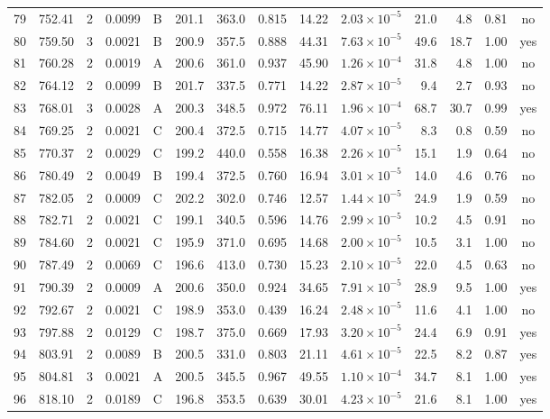 \begin{landscape}
\begin{longtable}{rrrrlrrrrrrrrc}
79 & 752.41 & 2 & 0.0099 & B & 201.1 & 363.0 & 0.815 & 14.22 & $2.03\times10^{-5}$ & 21.0 & 4.8 & 0.81 & no \\
80 & 759.50 & 3 & 0.0021 & B & 200.9 & 357.5 & 0.888 & 44.31 & $7.63\times10^{-5}$ & 49.6 & 18.7 & 1.00 & yes \\
81 & 760.28 & 2 & 0.0019 & A & 200.6 & 361.0 & 0.937 & 45.90 & $1.26\times10^{-4}$ & 31.8 & 4.8 & 1.00 & no \\
82 & 764.12 & 2 & 0.0099 & B & 201.7 & 337.5 & 0.771 & 14.22 & $2.87\times10^{-5}$ & 9.4 & 2.7 & 0.93 & no \\
83 & 768.01 & 3 & 0.0028 & A & 200.3 & 348.5 & 0.972 & 76.11 & $1.96\times10^{-4}$ & 68.7 & 30.7 & 0.99 & yes \\
84 & 769.25 & 2 & 0.0021 & C & 200.4 & 372.5 & 0.715 & 14.77 & $4.07\times10^{-5}$ & 8.3 & 0.8 & 0.59 & no \\
85 & 770.37 & 2 & 0.0029 & C & 199.2 & 440.0 & 0.558 & 16.38 & $2.26\times10^{-5}$ & 15.1 & 1.9 & 0.64 & no \\
86 & 780.49 & 2 & 0.0049 & B & 199.4 & 372.5 & 0.760 & 16.94 & $3.01\times10^{-5}$ & 14.0 & 4.6 & 0.76 & no \\
87 & 782.05 & 2 & 0.0009 & C & 202.2 & 302.0 & 0.746 & 12.57 & $1.44\times10^{-5}$ & 24.9 & 1.9 & 0.59 & no \\
88 & 782.71 & 2 & 0.0021 & C & 199.1 & 340.5 & 0.596 & 14.76 & $2.99\times10^{-5}$ & 10.2 & 4.5 & 0.91 & no \\
89 & 784.60 & 2 & 0.0021 & C & 195.9 & 371.0 & 0.695 & 14.68 & $2.00\times10^{-5}$ & 10.5 & 3.1 & 1.00 & no \\
90 & 787.49 & 2 & 0.0069 & C & 196.6 & 413.0 & 0.730 & 15.23 & $2.10\times10^{-5}$ & 22.0 & 4.5 & 0.63 & no \\
91 & 790.39 & 2 & 0.0009 & A & 200.6 & 350.0 & 0.924 & 34.65 & $7.91\times10^{-5}$ & 28.9 & 9.5 & 1.00 & yes \\
92 & 792.67 & 2 & 0.0021 & C & 198.9 & 353.0 & 0.439 & 16.24 & $2.48\times10^{-5}$ & 11.6 & 4.1 & 1.00 & no \\
93 & 797.88 & 2 & 0.0129 & C & 198.7 & 375.0 & 0.669 & 17.93 & $3.20\times10^{-5}$ & 24.4 & 6.9 & 0.91 & yes \\
94 & 803.91 & 2 & 0.0089 & B & 200.5 & 331.0 & 0.803 & 21.11 & $4.61\times10^{-5}$ & 22.5 & 8.2 & 0.87 & yes \\
95 & 804.81 & 3 & 0.0021 & A & 200.5 & 345.5 & 0.967 & 49.55 & $1.10\times10^{-4}$ & 34.7 & 8.1 & 1.00 & yes \\
96 & 818.10 & 2 & 0.0189 & C & 196.8 & 353.5 & 0.639 & 30.01 & $4.23\times10^{-5}$ & 21.6 & 8.1 & 1.00 & yes \\

\end{longtable}
\end{landscape}
